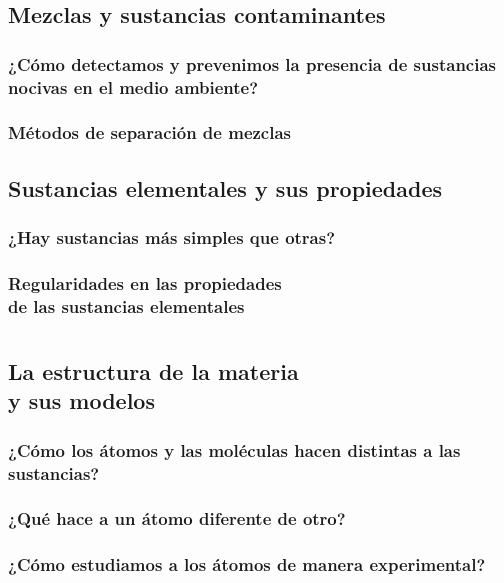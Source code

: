 \documentclass[11pt]{book}
\begin{document}
\newpage
\section{Mezclas y sustancias contaminantes}
\subsection{¿Cómo detectamos y prevenimos la presencia de sustancias nocivas en el medio ambiente?}

\subsection{Métodos de separación de mezclas}

\newpage
\section{Sustancias elementales y sus propiedades}
\subsection{¿Hay sustancias más simples que otras?}
\subsection{Regularidades en las propiedades\\ de las sustancias elementales}

\newpage
\chapter{}

\newpage
\section{La estructura de la materia \\y sus modelos}
\subsection{¿Cómo los átomos y las moléculas hacen distintas a las sustancias?}
\subsection{¿Qué hace a un átomo diferente de otro?}
\subsection{¿Cómo estudiamos a los átomos de manera experimental?}
\end{document}
